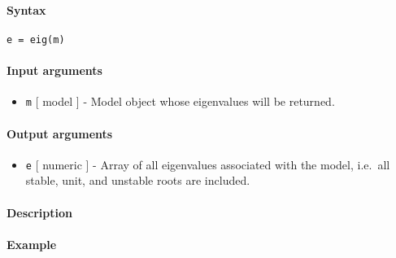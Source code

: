 


	\paragraph{Syntax}\label{syntax}

\begin{verbatim}
e = eig(m)
\end{verbatim}

\paragraph{Input arguments}\label{input-arguments}

\begin{itemize}
\itemsep1pt\parskip0pt
\item
  \texttt{m} {[} model {]} - Model object whose eigenvalues will be
  returned.
\end{itemize}

\paragraph{Output arguments}\label{output-arguments}

\begin{itemize}
\itemsep1pt\parskip0pt
\item
  \texttt{e} {[} numeric {]} - Array of all eigenvalues associated with
  the model, i.e.~all stable, unit, and unstable roots are included.
\end{itemize}

\paragraph{Description}\label{description}

\paragraph{Example}\label{example}


